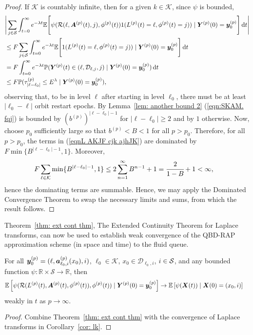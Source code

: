 \begin{proof}
	If \(\mathcal K\) is countably infinite, then for a given \(k\in\mathcal K\), since \(\psi\) is bounded,
	\begin{align}
		&\Bigg|\sum_{j\in\mathcal S}\int_{t=0}^\infty e^{-\lambda t}\mathbb E\Bigg[\psi( \mathcal R(\ell,\boldsymbol A^{(p)}(t),j),\phi^{(p)}(t) )  1({L}^{(p)}(t)=\ell,\phi^{(p)}(t)=j))  \mid \nonumber
		\boldsymbol Y^{(p)}(0)=\boldsymbol y_0^{(p)} \Bigg] \, \mathrm{d} t\Bigg| \nonumber 
		\\&\leq F \sum_{j\in\mathcal S}\int_{t=0}^\infty e^{-\lambda t}\mathbb E\Bigg[1({L}^{(p)}(t)=\ell,\phi^{(p)}(t)=j))  \mid \nonumber
		\boldsymbol Y^{(p)}(0)=\boldsymbol y_0^{(p)}\Bigg] \, \mathrm{d} t \nonumber 
		\\&= F  \int_{t=0}^\infty e^{-\lambda t}\mathbb P( {\boldsymbol Y}^{(p)}(t)\in(\ell,\mathcal D_{\ell,j},j) \mid   
		\boldsymbol Y^{(p)}(0)=\boldsymbol y_0^{(p)})\, \mathrm{d} t \nonumber 
		\\&\leq F \mathbb P(\tau_{|\ell-\ell_0|}^{(p)}\leq E^\lambda \mid
			\boldsymbol Y^{(p)}(0)=\boldsymbol y_0^{(p)}), \label{eqn:SKAM. fqj}
	\end{align}
	observing that, to be in level \(\ell\) after starting in level \(\ell_0\), there must be at least \(|\ell_0-\ell|\) orbit restart epochs. By Lemma~\ref{lem: another bound 2} (\ref{eqn:SKAM. fqj}) is bounded by \(\left(b^{(p)}\right)^{|\ell-\ell_0|-1}\) for \(|\ell-\ell_0|\geq 2\) and by \(1\) otherwise. Now, choose \(p_0\) sufficiently large so that \(b^{(p)}<B<1\) for all \(p>p_0\). Therefore, for all \(p>p_0\), the terms in (\ref{eqnL AKJF cjk ajhJK}) are dominated by \(F\min\{B^{|\ell-\ell_0|-1},1\}\). Moreover, 
	\begin{align*}
		F\sum_{\ell\in\mathcal K} \min\{B^{|\ell-\ell_0|-1},1\} 
		&\leq2\sum_{n=1}^\infty B^{n-1}+1
		=\cfrac{2}{1-B}+1
		<\infty,
	\end{align*}
	hence the dominating terms are summable. Hence, we may apply the Dominated Convergence Theorem to swap the necessary limits and sums, from which the result follows.
\end{proof} 

Theorem~\ref{thm: ext cont thm}, The Extended Continuity Theorem for Laplace transforms, can now be used to establish weak convergence of the QBD-RAP approximation scheme (in space and time) to the fluid queue. 

\begin{thm}\label{thm: big thm}
	For all \(\boldsymbol y_0^{(p)}=(\ell,\boldsymbol a_{\ell_0,i}^{(p)}(x_0),i)\), \(\ell_0\in\mathcal K\), \(x_0\in\mathcal D_{\ell_0,i}\), \(i\in\mathcal{S}\), and any bounded function \(\psi:\mathbb R\times \mathcal S \to \mathbb R\), then
	\begin{align}
			&\mathbb E\left[\psi( \mathcal R(L^{(p)}(t),\boldsymbol A^{(p)}(t),\phi^{(p)}(t)),\phi^{(p)}(t) )   \mid \boldsymbol Y^{(p)}(0)=\boldsymbol y_0^{(p)} \right] \nonumber 
			\to \mathbb E\left[\psi({\boldsymbol X}(t))\mid \boldsymbol X(0)=(x_0, i) \right] \nonumber
	\end{align}
	weakly in \(t\) as \(p\to \infty\). 
\end{thm}
\begin{proof}
	Combine Theorem~\ref{thm: ext cont thm} with the convergence of Laplace transforms in Corollary~\ref{cor: lk}. 
\end{proof}

